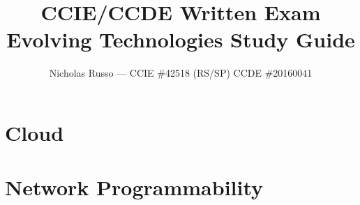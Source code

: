 \documentclass{article}
\title{CCIE/CCDE Written Exam Evolving Technologies Study Guide}
\author{Nicholas Russo --- CCIE \#42518 (RS/SP) CCDE \#20160041}
\begin{document}
\newcommand{\addimgnocaption}[2]{
  \begin{minipage}[t]{\linewidth}
  \centering
  \texttt{[image: \\imgpath\#1]}
  \end{minipage}
}

\newcommand{\addimg}[3]{
  \begin{minipage}[t]{\linewidth}
  \centering
  \captionsetup{type=figure}
  \texttt{[image: \\imgpath\#1]}
  \captionof{figure}{#3}
  \end{minipage}
}
\maketitle

\newpage
\begin{abstract}
\setlength\parindent{0pt}
\setlength{\parskip}{0.5cm}
\newcommand{\imgpath}{content/misc/img/}

\end{abstract}

\newpage
\tableofcontents
\listoffigures
\listoftables

\newpage
\section{Cloud}
\newcommand{\imgpath}{content/cloud/a1a-design/img/}






\renewcommand{\imgpath}{content/cloud/a1b-infra/img/}






\newpage
\section{Network Programmability}
\renewcommand{\imgpath}{content/netprog/a2a-archops/img/}





\end{document}
